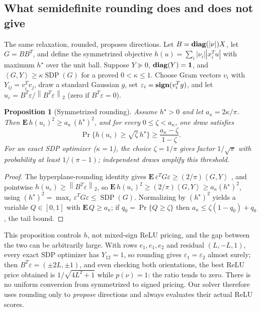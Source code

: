 \documentclass[12pt]{article}
\theoremstyle{plain}
\newtheorem{proposition}[theorem]{Proposition}
\theoremstyle{definition}
\newcommand{\norm}[1]{\left\lVert #1\right\rVert}
\newcommand{\ip}[2]{\left\langle #1,#2\right\rangle}
\newcommand{\ones}{\mathbf{1}}
\newcommand{\diag}{\mathop{\bf diag}}
\begin{document}
\subsection{What semidefinite rounding does and does not give}
\label{s-rounding}

The same relaxation, rounded, proposes directions. Let
$B=\diag(|\nu|)X$, let $G=BB^T$, and define the symmetrized objective
$h(u)=\sum_i|\nu_i||x_i^Tu|$ with maximum $h^\star$ over the unit ball.
Suppose $Y\succeq0$, $\diag(Y)=\ones$, and $\ip{G}{Y}\ge\kappa
\operatorname{SDP}(G)$ for a proved $0<\kappa\le1$. Choose Gram vectors $v_i$
with $Y_{ij}=v_i^Tv_j$, draw a standard Gaussian $g$, set
$\varepsilon_i=\mathop{\bf sign}(v_i^Tg)$, and let
$u_\varepsilon=B^T\varepsilon/\norm{B^T\varepsilon}_2$ (zero if
$B^T\varepsilon=0$).

\begin{proposition}[Symmetrized rounding]\label{p-rounding}
Assume $h^\star>0$ and let $a_\kappa=2\kappa/\pi$. Then
$\mathbf{E}\,h(u_\varepsilon)^2\ge a_\kappa\,(h^\star)^2$, and for every
$0\le\zeta<a_\kappa$, one draw satisfies
\[
 \Pr\{h(u_\varepsilon)\ge\sqrt\zeta\,h^\star\}
 \ge\frac{a_\kappa-\zeta}{1-\zeta}.
\]
For an exact SDP optimizer ($\kappa=1$), the choice $\zeta=1/\pi$ gives
factor $1/\sqrt\pi$ with probability at least $1/(\pi-1)$; independent draws
amplify this threshold.
\end{proposition}

\begin{proof}
The hyperplane-rounding identity gives
$\mathbf{E}\,\varepsilon^TG\varepsilon\ge(2/\pi)\ip{G}{Y}$
\citep{goemans1995improved}, and pointwise
$h(u_\varepsilon)\ge\norm{B^T\varepsilon}_2$, so
$\mathbf{E}\,h(u_\varepsilon)^2\ge(2/\pi)\ip{G}{Y}\ge a_\kappa(h^\star)^2$,
using $(h^\star)^2=\max_\varepsilon\varepsilon^TG\varepsilon\le\operatorname{SDP}(G)$.
Normalizing by $(h^\star)^2$ yields a variable $Q\in[0,1]$ with
$\mathbf{E}\,Q\ge a_\kappa$; if $q_0=\Pr\{Q\ge\zeta\}$ then
$a_\kappa\le\zeta(1-q_0)+q_0$, the tail bound.
\end{proof}

This proposition controls $h$, not mixed-sign ReLU pricing, and the gap
between the two can be arbitrarily large. With rows $e_1,e_1,e_2$ and residual $(L,-L,1)$,
every exact SDP optimizer has $Y_{12}=1$, so rounding gives
$\varepsilon_1=\varepsilon_2$ almost surely; then
$B^T\varepsilon=(\pm2L,\pm1)$, and even checking both orientations, the best
ReLU price obtained is $1/\sqrt{4L^2+1}$ while $p(\nu)=1$: the ratio tends to
zero. There is no uniform conversion from symmetrized to signed pricing. Our
solver therefore uses rounding only to \emph{propose} directions and always
evaluates their actual ReLU scores.
\end{document}
